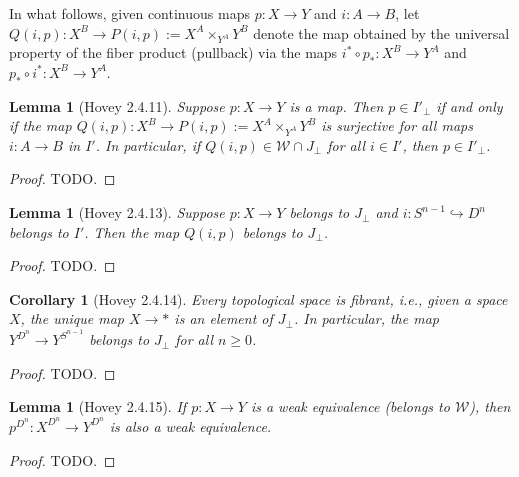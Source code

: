 \documentclass{amsart}
\theoremstyle{plain}
\newtheorem{corollary}[theorem]{Corollary}
\newtheorem{lemma}[theorem]{Lemma}
\theoremstyle{definition}
\newcommand{\0}{\mathbf{0}}
\newcommand{\p}{{_\perp}}
\newcommand{\into}{\hookrightarrow}
\newcommand{\cW}{\mathcal W}
\renewcommand{\(}{\left(}
\renewcommand{\)}{\right)}
\begin{document}
In what follows, given continuous maps $p:X\to Y$ and $i:A\to B$, let $Q(i,p):X^B\to P(i,p):=X^A\times_{Y^A}Y^B$ denote the map obtained by the universal property of the fiber product (pullback) via the maps $i^\ast\circ p_\ast:X^B\to Y^A$ and $p_\ast\circ i^\ast:X^B\to Y^A$.

\begin{lemma}[Hovey 2.4.11]\label{2.4.11}
  Suppose $p:X\to Y$ is a map. Then $p\in I'\p$ if and only if the map $Q(i,p):X^B\to P(i,p):=X^A\times_{Y^A} Y^B$ is surjective for all maps $i:A\to B$ in $I'$. In particular, if $Q(i,p)\in\cW\cap J\p$ for all $i\in I'$, then $p\in I'\p$.
\end{lemma}
\begin{proof}
  \color{red}TODO.
\end{proof}

\begin{lemma}[Hovey 2.4.13]\label{2.4.13}
  Suppose $p:X\to Y$ belongs to $J\p$ and $i:S^{n-1}\into D^n$ belongs to $I'$. Then the map $Q(i,p)$ belongs to $J\p$.
\end{lemma}
\begin{proof}
  \color{red}TODO.
\end{proof}

\begin{corollary}[Hovey 2.4.14]\label{2.4.14}
  Every topological space is fibrant, i.e., given a space $X$, the unique map $X\to\ast$ is an element of $J\p$. In particular, the map $Y^{D^n}\to Y^{S^{n-1}}$ belongs to $J\p$ for all $n\geq0$.
\end{corollary}
\begin{proof}
  \color{red}TODO.
\end{proof}

\begin{lemma}[Hovey 2.4.15]\label{2.4.15}
  If $p:X\to Y$ is a weak equivalence (belongs to $\cW$), then $p^{D^n}:X^{D^n}\to Y^{D^n}$ is also a weak equivalence.
\end{lemma}
\begin{proof}
  \color{red}TODO.
\end{proof}
\end{document}
